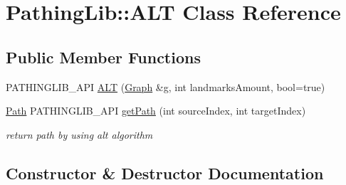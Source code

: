 \hypertarget{class_pathing_lib_1_1_a_l_t}{}\section{Pathing\+Lib\+:\+:A\+LT Class Reference}
\label{class_pathing_lib_1_1_a_l_t}
\subsection*{Public Member Functions}
\begin{DoxyCompactItemize}
\item 
P\+A\+T\+H\+I\+N\+G\+L\+I\+B\+\_\+\+A\+PI \hyperlink{class_pathing_lib_1_1_a_l_t_a9c142ab08eee125a86f86cf9b8fe0657}{A\+LT} (\hyperlink{class_pathing_lib_1_1_graph}{Graph} \&g, int landmarks\+Amount, bool=true)
\item 
\hyperlink{class_pathing_lib_1_1_path}{Path} P\+A\+T\+H\+I\+N\+G\+L\+I\+B\+\_\+\+A\+PI \hyperlink{class_pathing_lib_1_1_a_l_t_a58becb2d51cc5a4e9d27124514ebe68d}{get\+Path} (int source\+Index, int target\+Index)\hypertarget{class_pathing_lib_1_1_a_l_t_a58becb2d51cc5a4e9d27124514ebe68d}{}\label{class_pathing_lib_1_1_a_l_t_a58becb2d51cc5a4e9d27124514ebe68d}

\begin{DoxyCompactList}\small\item\em return path by using alt algorithm ~\newline
 \end{DoxyCompactList}\end{DoxyCompactItemize}


\subsection{Constructor \& Destructor Documentation}
